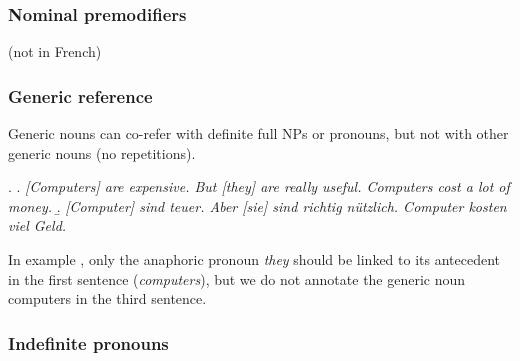\documentclass[a4paper]{article}
\begin{document}
\subsubsection{Nominal premodifiers}
(not in French)

% 
% 
% 

\subsubsection{Generic reference}

Generic nouns can co-refer with definite full NPs or pronouns, but not with other generic nouns (no repetitions).

\ex.
\a. {\sl [Computers] are expensive. But [they] are really useful. Computers cost a lot of money.}
\b.  {\sl  [Computer] sind teuer. Aber [sie] sind richtig nützlich. Computer kosten viel Geld.}

In example \Last, only the anaphoric pronoun {\sl they} should be linked to its antecedent in the first sentence ({\sl computers}), but we do not annotate the generic noun computers in the third sentence.

\subsubsection{Indefinite pronouns}
\end{document}
